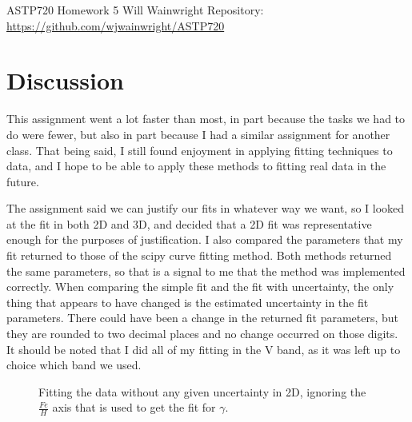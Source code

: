 \documentclass[twocolumn,11pt]{article}
\begin{document}
\pagestyle{plain}
\onecolumn
ASTP720 
\newline Homework 5
\newline Will Wainwright
\newline Repository: \href{https://github.com/wjwainwright/ASTP720}{https://github.com/wjwainwright/ASTP720}

\section*{Discussion}
This assignment went a lot faster than most, in part because the tasks we had to do were fewer, but also in part because I had a similar assignment for another class. That being said, I still found enjoyment in applying fitting techniques to data, and I hope to be able to apply these methods to fitting real data in the future.

The assignment said we can justify our fits in whatever way we want, so I looked at the fit in both 2D and 3D, and decided that a 2D fit was representative enough for the purposes of justification. I also compared the parameters that my fit returned to those of the scipy curve fitting method. Both methods returned the same parameters, so that is a signal to me that the method was implemented correctly. When comparing the simple fit and the fit with uncertainty, the only thing that appears to have changed is the estimated uncertainty in the fit parameters. There could have been a change in the returned fit parameters, but they are rounded to two decimal places and no change occurred on those digits. It should be noted that I did all of my fitting in the V band, as it was left up to choice which band we used. 


\begin{figure}[!h]
	\centering
	\noindent
      \caption{Fitting the data without any given uncertainty in 2D, ignoring the $\frac{Fe}{H}$ axis that is used to get the fit for $\gamma$.}
\end{figure}
\end{document}
